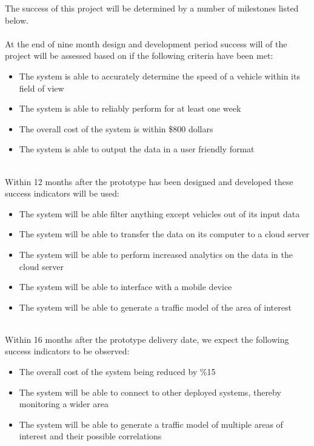 The success of this project will be determined by a number of milestones listed below.
\\
\\
At the end of nine month design and development period success will of the project will be assessed based on if the following criteria have been met:
\begin{itemize}
  \item The system is able to accurately determine the speed of a vehicle within its field of view
  \item The system is able to reliably perform for at least one week
  \item The overall cost of the system is within \$800 dollars
  \item The system is able to output the data in a user friendly format
\end{itemize}
\\
Within 12 months after the prototype has been designed and developed these success indicators will be used:
\begin{itemize}
  \item The system will be able filter anything except vehicles out of its input data
  \item The system will be able to transfer the data on its computer to a cloud server
  \item The system will be able to perform increased analytics on the data in the cloud server
  \item The system will be able to interface with a mobile device
  \item The system will be able to generate a traffic model of the area of interest
\end{itemize}
\\
Within 16 months after the prototype delivery date, we expect the following success indicators to be observed:
\begin{itemize}
  \item The overall cost of the system being reduced by \%15
  \item The system will be able to connect to other deployed systems, thereby monitoring a wider area
  \item The system will be able to generate a traffic model of multiple areas of interest and their possible correlations
\end{itemize}